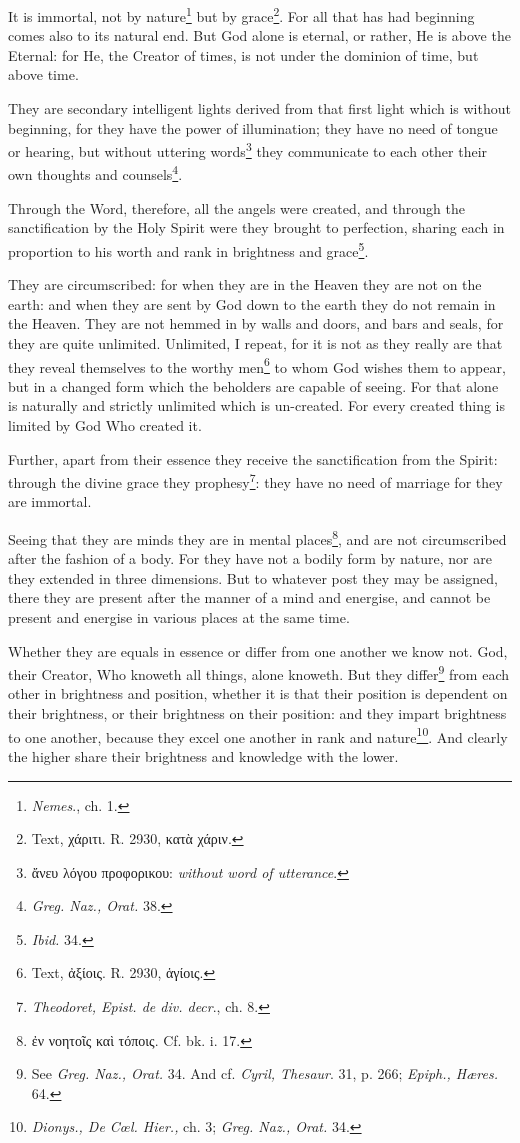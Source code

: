 It is immortal, not by nature\footnote{\emph{Nemes}., ch. 1.} but by grace\footnote{Text, \textgreek{χάριτι}. R. 2930, \textgreek{κατὰ χάριν}.}. For all that has had beginning comes also to its natural end. But God alone is eternal, or rather, He is above the Eternal: for He, the Creator of times, is not under the dominion of time, but above time.

They are secondary intelligent lights derived from that first light which is without beginning, for they have the power of illumination; they have no need of tongue or hearing, but without uttering words\footnote{\textgreek{ἄνευ λόγου προφορικου}: \emph{without word of utterance}.} they communicate to each other their own thoughts and counsels\footnote{\emph{Greg. Naz., Orat. }38.}.

Through the Word, therefore, all the angels were created, and through the sanctification by the Holy Spirit were they brought to perfection, sharing each in proportion to his worth and rank in brightness and grace\footnote{\emph{Ibid.} 34.}.

They are circumscribed: for when they are in the Heaven they are not on the earth: and when they are sent by God down to the earth they do not remain in the Heaven. They are not hemmed in by walls and doors, and bars and seals, for they are quite unlimited. Unlimited, I repeat, for it is not as they really are that they reveal themselves to the worthy men\footnote{Text, \textgreek{ἀξίοις}. R. 2930, \textgreek{ἁγίοις}.} to whom God wishes them to appear, but in a changed form which the beholders are capable of seeing. For that alone is naturally and strictly unlimited which is un-created. For every created thing is limited by God Who created it.

Further, apart from their essence they receive the sanctification from the Spirit: through the divine grace they prophesy\footnote{\emph{Theodoret, Epist. de div. decr}., ch. 8.}: they have no need of marriage for they are immortal.

Seeing that they are minds they are in mental places\footnote{\textgreek{ἐν νοητοῖς καὶ τόποις}. Cf. bk. i. 17.}, and are not circumscribed after the fashion of a body. For they have not a bodily form by nature, nor are they extended in three dimensions. But to whatever post they may be assigned, there they are present after the manner of a mind and energise, and cannot be present and energise in various places at the same time.

Whether they are equals in essence or differ from one another we know not. God, their Creator, Who knoweth all things, alone knoweth. But they differ\footnote{See \emph{Greg. Naz., Orat. }34. And cf. \emph{Cyril, Thesaur}. 31, p. 266; \emph{Epiph., Hæres. }64.} from each other in brightness and position, whether it is that their position is dependent on their brightness, or their brightness on their position: and they impart brightness to one another, because they excel one another in rank and nature\footnote{\emph{Dionys., De Cœl. Hier., }ch. 3; \emph{Greg. Naz., Orat.} 34.}. And clearly the higher share their brightness and knowledge with the lower.

